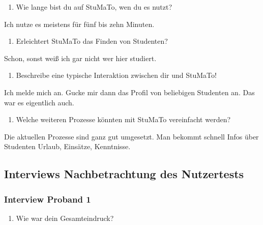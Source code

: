 \documentclass[
  12pt,
  ngerman,
  a4paper,
]{article}
\providecommand{\tightlist}{%
  \setlength{\itemsep}{0pt}\setlength{\parskip}{0pt}}
\begin{document}
\begin{enumerate}
\def\labelenumi{\arabic{enumi}.}
\setcounter{enumi}{12}
\tightlist
\item
  Wie lange bist du auf StuMaTo, wen du es nutzt?
\end{enumerate}

Ich nutze es meistens für fünf bis zehn Minuten.

\begin{enumerate}
\def\labelenumi{\arabic{enumi}.}
\setcounter{enumi}{13}
\tightlist
\item
  Erleichtert StuMaTo das Finden von Studenten?
\end{enumerate}

Schon, sonst weiß ich gar nicht wer hier studiert.

\begin{enumerate}
\def\labelenumi{\arabic{enumi}.}
\setcounter{enumi}{14}
\tightlist
\item
  Beschreibe eine typische Interaktion zwischen dir und StuMaTo!
\end{enumerate}

Ich melde mich an. Gucke mir dann das Profil von beliebigen Studenten
an. Das war es eigentlich auch.

\begin{enumerate}
\def\labelenumi{\arabic{enumi}.}
\setcounter{enumi}{15}
\tightlist
\item
  Welche weiteren Prozesse könnten mit StuMaTo vereinfacht werden?
\end{enumerate}

Die aktuellen Prozesse sind ganz gut umgesetzt. Man bekommt schnell
Infos über Studenten Urlaub, Einsätze, Kenntnisse.

\hypertarget{interviews-nachbetrachtung-des-nutzertests}{%
\subsection{Interviews Nachbetrachtung des
Nutzertests}\label{interviews-nachbetrachtung-des-nutzertests}}

\hypertarget{interview-proband-1}{%
\subsubsection{Interview Proband 1}\label{interview-proband-1}}

\begin{enumerate}
\def\labelenumi{\arabic{enumi}.}
\tightlist
\item
  Wie war dein Gesamteindruck?
\end{enumerate}
\end{document}
